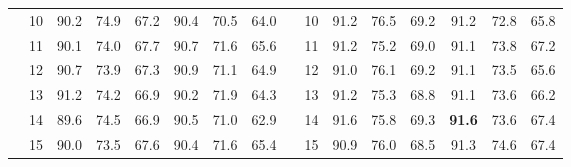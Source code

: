 \begin{table}[p]
{\begin{tabular}{c c | c c c | c c c || c c | c c c | c c c}
             & 10 & 90.2 & 74.9 & 67.2 & 90.4 & 70.5 & 64.0 &  & 10 & 91.2 & 76.5 & 69.2 & 91.2 & 72.8 & 65.8 \\
             & 11 & 90.1 & 74.0 & 67.7 & 90.7 & 71.6 & 65.6 &  & 11 & 91.2 & 75.2 & 69.0 & 91.1 & 73.8 & 67.2 \\
             & 12 & 90.7 & 73.9 & 67.3 & 90.9 & 71.1 & 64.9 &  & 12 & 91.0 & 76.1 & 69.2 & 91.1 & 73.5 & 65.6 \\
             & 13 & 91.2 & 74.2 & 66.9 & 90.2 & 71.9 & 64.3 &  & 13 & 91.2 & 75.3 & 68.8 & 91.1 & 73.6 & 66.2 \\
             & 14 & 89.6 & 74.5 & 66.9 & 90.5 & 71.0 & 62.9 &  & 14 & 91.6 & 75.8 & 69.3 & \textbf{91.6} & 73.6 & 67.4 \\
             & 15 & 90.0 & 73.5 & 67.6 & 90.4 & 71.6 & 65.4 &  & 15 & 90.9 & 76.0 & 68.5 & 91.3 & 74.6 & 67.4 \\
    \bottomrule
\end{tabular}%
}
\label{tab:duration_all_plain}
\end{table}